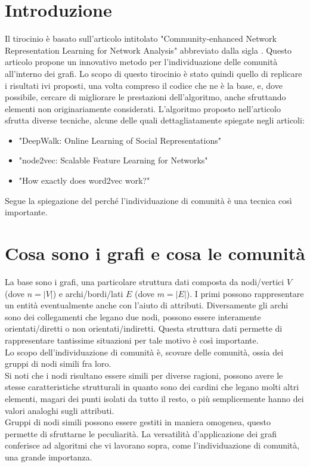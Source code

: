 \section{Introduzione}
Il tirocinio è basato sull'articolo intitolato "Community-enhanced Network Representation Learning for Network Analysis"\cite{CNRL_paper} abbreviato dalla sigla \cnrl. Questo articolo propone un innovativo metodo per l'individuazione delle comunità all'interno dei grafi. Lo scopo di questo tirocinio è stato quindi quello di replicare i risultati ivi proposti, una volta compreso il codice che ne è la base, e, dove possibile, cercare di migliorare le prestazioni dell'algoritmo, anche sfruttando elementi non originariamente considerati.\newline
L'algoritmo proposto nell'articolo sfrutta diverse tecniche, alcune delle quali dettagliatamente spiegate negli articoli:
\begin{itemize}
	\item "DeepWalk: Online Learning of Social Representations"\cite{DW_paper}
	\item "node2vec: Scalable Feature Learning for Networks"\cite{N2V_paper}
	\item "How exactly does word2vec work?"\cite{W2V_paper}
\end{itemize} 
Segue la spiegazione del perché l'individuazione di comunità è una tecnica così importante.
%
\section{Cosa sono i grafi e cosa le comunità}
La base sono i grafi, una particolare struttura dati composta da nodi/vertici $V$ (dove $n=|V|$) e archi/bordi/lati $E$ (dove $m=|E|$). I primi possono rappresentare un entità eventualmente anche con l'aiuto di attributi. Diversamente gli archi sono dei collegamenti che legano due nodi, possono essere interamente orientati/diretti o non orientati/indiretti. Questa struttura dati permette di rappresentare tantissime situazioni per tale motivo è così importante.\\
Lo scopo dell'individuazione di comunità è, scovare delle comunità, ossia dei gruppi di nodi simili fra loro.\\
Si noti che i nodi risultano essere simili per diverse ragioni, possono avere le stesse caratteristiche strutturali in quanto sono dei cardini che legano molti altri elementi, magari dei punti isolati da tutto il resto, o più semplicemente hanno dei valori analoghi sugli attributi.\\
Gruppi di nodi simili possono essere gestiti in maniera omogenea, questo permette di sfruttarne le peculiarità. La versatilità d'applicazione dei grafi conferisce ad algoritmi che vi lavorano sopra, come l'individuazione di comunità, una grande importanza.
%

